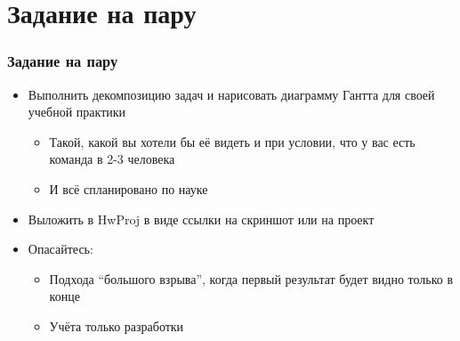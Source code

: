 \documentclass{../../slides-style}
\begin{document}
    \begin{frame}[plain]
        \titlepage
    \end{frame}

    \section{Задание на пару}

    \begin{frame}
        \frametitle{Задание на пару}
        \begin{itemize}
            \item Выполнить декомпозицию задач и нарисовать диаграмму Гантта для своей учебной практики
            \begin{itemize}
                \item Такой, какой вы хотели бы её видеть и при условии, что у вас есть команда в 2-3 человека
                \item И всё спланировано по науке
            \end{itemize}
            \item Выложить в HwProj в виде ссылки на скриншот или на проект
            \item Опасайтесь:
            \begin{itemize}
                \item Подхода ``большого взрыва'', когда первый результат будет видно только в конце
                \item Учёта только разработки
            \end{itemize}
        \end{itemize}
    \end{frame}
\end{document}

